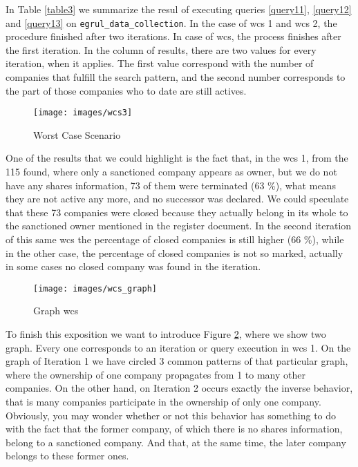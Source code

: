 \begin{spacing}{1.5}
 In Table \ref{table3} we summarize the resul of executing queries \ref{query11}, \ref{query12} and \ref{query13} on  \texttt{egrul\_data\_collection}. In the case of \gls{wcs} 1 and \gls{wcs} 2, the procedure finished after two iterations. In case of \gls{wcs}, the process finishes after the first iteration. In the column of results, there are two values for every iteration, when it applies. The first value correspond with the number of companies that fulfill the search pattern, and the second number corresponds to the part of those companies who to date are still actives. 


\begin{figure}
	\centering
	\texttt{[image: images/wcs3]}
	\caption{Worst Case Scenario}\label{figure8}
\end{figure}

One of the results that we could highlight is the fact that, in the \gls{wcs} 1, from the 115 found, where only a sanctioned company appears as owner, but we do not have any shares information,  73 of them were terminated (63 \%), what means they are not active any more, and no successor was declared. We could speculate that these 73 companies were closed because they actually belong in its whole to the sanctioned owner mentioned in the register document. In the second iteration of this same \gls{wcs} the percentage of closed companies is still higher (66 \%), while in the other case, the percentage of closed companies is not so marked, actually in some cases no closed company was found in the iteration. 


\begin{figure}
	\centering
\texttt{[image: images/wcs\_graph]}
    \vspace{-3cm}
	\caption{Graph \gls{wcs}}\label{figure9}
\end{figure}

To finish this exposition we want to introduce Figure \ref{figure9}, where we show two graph. Every one corresponds to an iteration or query execution in \gls{wcs} 1. On the graph of Iteration 1 we have circled 3 common patterns of that particular graph, where the ownership of one company propagates from 1 to many other companies. On the other hand, on Iteration 2 occurs exactly the inverse behavior, that is many companies participate in the ownership of only one company. 
Obviously, you may wonder whether or not this behavior has something to do with the fact that the former company,  of which there is no shares information, belong to a sanctioned company. And that, at the same time, the later company belongs to these former ones. 


\end{spacing}
